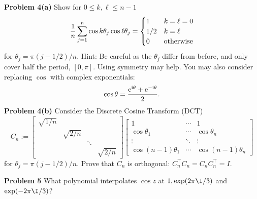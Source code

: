 \documentclass[12pt,a4paper]{article}
\begin{document}
\textbf{Problem 4(a)} Show for $0 \ensuremath{\leq} k,\ensuremath{\ell} \ensuremath{\leq} n-1$
\[
{1 \over n} \sum_{j=1}^n \cos k \ensuremath{\theta}_j \cos \ensuremath{\ell} \ensuremath{\theta}_j = \begin{cases} 1 & k = \ensuremath{\ell} = 0 \\
                                                  1/2 & k = \ensuremath{\ell} \\
                                                  0 & \hbox{otherwise}
                                                  \end{cases}
\]
for $\ensuremath{\theta}_j = \ensuremath{\pi}(j-1/2)/n$. Hint: Be careful as the $\ensuremath{\theta}_j$ differ from before,  and only cover half the period, $[0,\ensuremath{\pi}]$. Using symmetry may help. You may also consider replacing $\cos$ with  complex exponentials:
\[
\cos \ensuremath{\theta} = {{\rm e}^{{\rm i}\ensuremath{\theta}} + {\rm e}^{-{\rm i}\ensuremath{\theta}} \over 2}.
\]
\textbf{Problem 4(b)} Consider the Discrete Cosine Transform (DCT)
\[
C_n := \begin{bmatrix}
\sqrt{1/n} \\
 & \sqrt{2/n} \\ 
 && \ensuremath{\ddots} \\
 &&& \sqrt{2/n}
 \end{bmatrix}
\begin{bmatrix}
    1 & \ensuremath{\cdots} & 1\\
    \cos \ensuremath{\theta}_1 & \ensuremath{\cdots} & \cos \ensuremath{\theta}_n \\
    \ensuremath{\vdots} & \ensuremath{\ddots} & \ensuremath{\vdots} \\
    \cos (n-1)\ensuremath{\theta}_1 & \ensuremath{\cdots} & \cos (n-1)\ensuremath{\theta}_n
\end{bmatrix}
\]
for $\ensuremath{\theta}_j = \ensuremath{\pi}(j-1/2)/n$. Prove that $C_n$ is orthogonal: $C_n^\ensuremath{\top} C_n = C_n C_n^\ensuremath{\top} = I$.

\textbf{Problem 5} What polynomial interpolates $\cos z$ at $1, \exp(2\ensuremath{\pi}\I/3)$ and $\exp(-2\ensuremath{\pi}\I/3)$?
\end{document}
